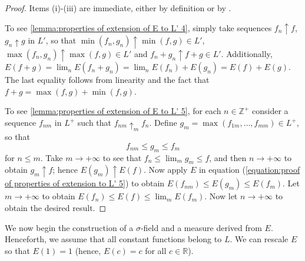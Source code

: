 \begin{proof}
		Items (i)-(iii) are immediate, either by definition or by .

		To see \cref{lemma:properties of extension of E to L' 4}, simply take sequences \(f_n\uparrow f\), \(g_n\uparrow g\) in \(L'\), so that \(\min(f_n,g_n)\uparrow \min(f,g)\in L'\), \(\max(f_n,g_n)\uparrow \max(f,g)\in L'\) and \(f_n+g_n\uparrow f+g\in L'\). Additionally, \(E(f+g)=\lim_nE(f_n+g_n)=\lim_nE(f_n)+E(g_n)=E(f)+E(g)\). The last equality follows from linearity and the fact that \(f+g=\max(f,g)+\min(f,g)\).

		To see \ref{lemma:properties of extension of E to L' 5}, for each \(n\in\mathbb{Z}^{+}\) consider a sequence \(f_{nm}\) in \(L^{+}\) such that \(f_{nm}\uparrow_m f_n\). Define \(g_m=\max(f_{1m},\dots,f_{mm})\in L^{+}\), so that 
		\begin{equation}\label{equation:proof of properties of extension to L' 5}
		f_{nm}\leq g_m\leq f_m
		\end{equation}
		for \(n\leq m\). Take \(m\to+\infty\) to see that \(f_n\leq\lim_mg_m\leq f\), and then \(n\to+\infty\) to obtain \(g_m\uparrow f\); hence \(E(g_m)\uparrow E(f)\).
		Now apply \(E\) in equation (\ref{equation:proof of properties of extension to L' 5}) to obtain \(E(f_{nm})\leq E(g_m)\leq E(f_m)\). Let \(m\to+\infty\) to obtain \(E(f_n)\leq E(f)\leq\lim_m E(f_m)\). Now let \(n\to+\infty\) to obtain the desired result.
\end{proof}
We now begin the construction of a \(\sigma\)-field and a measure derived from \(E\). Henceforth, we assume that all constant functions belong to \(L\). We can rescale \(E\) so that \(E(1)=1\) (hence, \(E(c)=c\) for all \(c\in\mathbb{R}\)).

